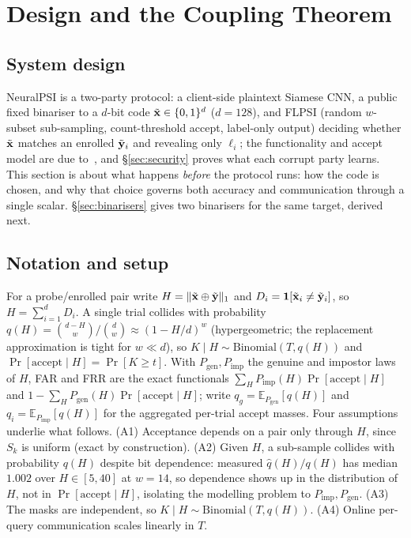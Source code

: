 \section{Design and the Coupling Theorem}
\label{sec:design}

\subsection{System design}
\label{sec:design-overview}

NeuralPSI is a two-party protocol: a client-side plaintext Siamese CNN, a public fixed binariser to a
$d$-bit code $\tilde{\mathbf{x}} \in \{0,1\}^d$ ($d=128$), and FLPSI (random $w$-subset sub-sampling, count-threshold
accept, label-only output) deciding whether $\tilde{\mathbf{x}}$ matches an enrolled $\tilde{\mathbf{y}}_i$ and revealing only
$\ell_i$; the functionality and accept model are due to~\cite{UzunEtAl21}, and \S\ref{sec:security}
proves what each corrupt party learns. This section is about what happens \emph{before} the protocol
runs: how the code is chosen, and why that choice governs both accuracy and communication through a
single scalar. \S\ref{sec:binarisers} gives two binarisers for the same target, derived next.

\subsection{Notation and setup}
\label{sec:coupling-setup}

For a probe/enrolled pair write $H = \lVert \tilde{\mathbf{x}} \oplus \tilde{\mathbf{y}}\rVert_1$ and $D_i = \mathbf{1}[\tilde{\mathbf{x}}_i \neq
\tilde{\mathbf{y}}_i]$, so $H = \sum_{i=1}^d D_i$. A single trial collides with probability $q(H) =
\binom{d-H}{w}/\binom{d}{w} \approx (1-H/d)^{w}$ (hypergeometric; the replacement approximation is tight
for $w\ll d$), so $K \mid H \sim \mathrm{Binomial}(T, q(H))$ and $\Pr[\text{accept}\mid H] = \Pr[K\ge
t]$. With $P_{\mathrm{gen}}, P_{\mathrm{imp}}$ the genuine and impostor laws of $H$, FAR and FRR are the
exact functionals $\sum_H P_{\mathrm{imp}}(H)\Pr[\text{accept}\mid H]$ and $1-\sum_H
P_{\mathrm{gen}}(H)\Pr[\text{accept}\mid H]$; write $q_g = \mathbb{E}_{P_{\mathrm{gen}}}[q(H)]$ and
$q_i = \mathbb{E}_{P_{\mathrm{imp}}}[q(H)]$ for the aggregated per-trial accept masses. Four assumptions
underlie what follows. (A1) Acceptance depends
on a pair only through $H$, since $S_k$ is uniform (exact by construction). (A2) Given $H$, a
sub-sample collides with probability $q(H)$ despite bit dependence: measured $\hat q(H)/q(H)$ has median
$1.002$ over $H \in [5,40]$ at $w=14$, so dependence shows up in the distribution of $H$, not in
$\Pr[\text{accept}\mid H]$, isolating the modelling problem to $P_{\mathrm{imp}},P_{\mathrm{gen}}$. (A3)
The masks are independent, so $K \mid H \sim \mathrm{Binomial}(T, q(H))$. (A4) Online per-query
communication scales linearly in $T$.

